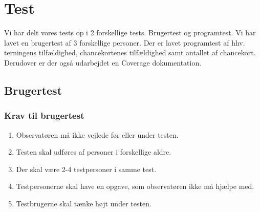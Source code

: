\section{Test}
Vi har delt vores tests op i 2 forskellige tests. Brugertest og programtest.
Vi har lavet en brugertest af 3 forskellige personer. Der er lavet programtest af hhv. terningens tilfældighed, chancekortenes tilfældighed samt antallet af chancekort. Derudover er der også udarbejdet en Coverage dokumentation.






\subsection{Brugertest}

\subsubsection{Krav til brugertest}
\begin{enumerate}
    \item Observatøren må ikke vejlede før eller under testen.
    \item Testen skal udføres af personer i forskellige aldre.
    \item Der skal være 2-4 testpersoner i samme test.
    \item Testpersonerne skal have en opgave, som observatøren ikke må hjælpe med.
    \item Testbrugerne skal tænke højt under testen.
\end{enumerate}



